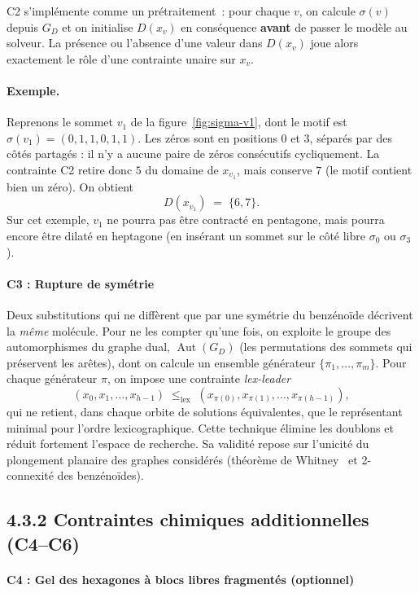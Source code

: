 \documentclass[11pt,a4paper]{article}
\newcommand{\GD}{\ensuremath{G_D}}                 %
\newcommand{\Aut}{\operatorname{Aut}}
\begin{document}
C2 s'implémente comme un prétraitement~: pour chaque $v$, on calcule
$\sigma(v)$ depuis $\GD$ et on initialise $D(x_v)$ en conséquence \textbf{avant}
de passer le modèle au solveur. La présence ou l'absence d'une valeur
dans $D(x_v)$ joue alors exactement le rôle d'une contrainte unaire
sur $x_v$.

\paragraph{Exemple.} Reprenons le sommet $v_1$ de la
figure~\ref{fig:sigma-v1}, dont le motif est
$\sigma(v_1) = (0, 1, 1, 0, 1, 1)$. Les zéros sont en positions $0$
et $3$, séparés par des côtés partagés : il n'y a aucune paire de zéros
consécutifs cycliquement. La contrainte C2 retire donc $5$ du domaine
de $x_{v_1}$, mais conserve $7$ (le motif contient bien un zéro). On
obtient
\[
  D(x_{v_1}) \;=\; \{6, 7\} .
\]
Sur cet exemple, $v_1$ ne pourra pas être contracté en pentagone, mais
pourra encore être dilaté en heptagone (en insérant un sommet sur le
côté libre $\sigma_0$ ou $\sigma_3$).

\paragraph*{C3 : Rupture de symétrie}
\label{sec:c3}

Deux substitutions qui ne diffèrent que par une symétrie du benzénoïde
décrivent la \emph{même} molécule. Pour ne les compter qu'une fois, on
exploite le groupe des automorphismes du graphe dual, $\Aut(\GD)$ (les
permutations des sommets qui préservent les arêtes), dont on calcule un
ensemble générateur $\{\pi_1, \dots, \pi_m\}$. Pour chaque générateur $\pi$,
on impose une contrainte \emph{lex-leader}
\[
  (x_0, x_1, \dots, x_{h-1}) \;\le_{\text{lex}}\; (x_{\pi(0)}, x_{\pi(1)}, \dots, x_{\pi(h-1)}),
\]
qui ne retient, dans chaque orbite de solutions équivalentes, que le
représentant minimal pour l'ordre lexicographique. Cette technique élimine
les doublons et réduit fortement l'espace de recherche. Sa validité repose
sur l'unicité du plongement planaire des graphes considérés (théorème de
Whitney~\cite{whitney} et 2-connexité des benzénoïdes).

\subsection*{4.3.2 Contraintes chimiques additionnelles (C4--C6)}

\paragraph*{C4 : Gel des hexagones à blocs libres fragmentés (optionnel)}
\label{sec:c4-fragmentes}
\end{document}
